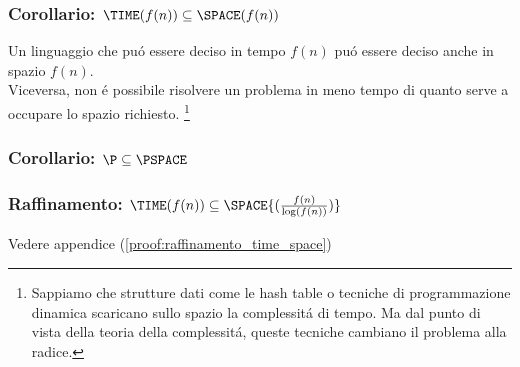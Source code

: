 \subsubsection{Corollario: $\TIME(f(n)) \subseteq \SPACE(f(n))$}
Un linguaggio che puó essere deciso in tempo $f(n)$ puó essere deciso anche in spazio $f(n)$. \\
Viceversa, non é possibile risolvere un problema in meno tempo di quanto serve a occupare lo spazio richiesto.
\footnote{Sappiamo che strutture dati come le hash table o tecniche di programmazione dinamica scaricano sullo spazio la complessitá di tempo. Ma dal punto di vista della teoria della complessitá, queste tecniche cambiano il problema alla radice.}

\subsubsection{Corollario: $\P \subseteq \PSPACE$}

\subsubsection{Raffinamento: $\TIME(f(n)) \subseteq \SPACE{ ( \frac{f(n)}{\log(f(n))} ) }$}
\label{raffinamento:time_space}
Vedere appendice (\ref{proof:raffinamento_time_space})


